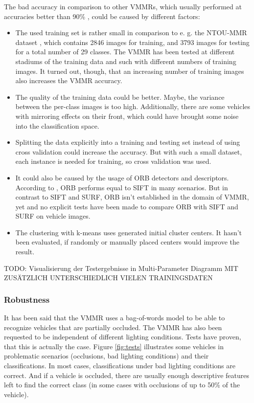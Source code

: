 The bad accuracy in comparison to other VMMRs, which usually performed at accuracies better than 90\% \citep{petrovic2004analysis} \citep{siddiqui2015robust}, could be caused by different factors:
\begin{itemize}
  \item The used training set is rather small in comparison to e. g. the NTOU-MMR dataset \citep{ntoummrDataset}, which contains 2846 images for training, and 3793 images for testing for a total number of 29 classes. The VMMR has been tested at different stadiums of the training data and such with different numbers of training images. It turned out, though, that an increasing number of training images also increases the VMMR accuracy.
  \item The quality of the training data could be better. Maybe, the variance between the per-class images is too high. Additionally, there are some vehicles with mirroring effects on their front, which could have brought some noise into the classification space.
  \item Splitting the data explicitly into a training and testing set instead of using cross validation could increase the accuracy. But with such a small dataset, each instance is needed for training, so cross validation was used.
  \item It could also be caused by the usage of ORB detectors and descriptors. According to \citep{rublee2011orb}, ORB performs equal to SIFT in many scenarios. But in contrast to SIFT and SURF, ORB isn't established in the domain of VMMR, yet and no explicit tests have been made to compare ORB with SIFT and SURF on vehicle images.
  \item The clustering with k-means uses generated initial cluster centers. It hasn't been evaluated, if randomly or manually placed centers would improve the result.
\end{itemize}

TODO: Visualisierung der Testergebnisse in Multi-Parameter Diagramm MIT ZUSÄTZLICH UNTERSCHIEDLICH VIELEN TRAININGSDATEN

\subsubsection{Robustness}
It has been said that the VMMR uses a bag-of-words model to be able to recognize vehicles that are partially occluded. The VMMR has also been requested to be independent of different lighting conditions. Tests have proven, that this is actually the case. Figure \ref{fig:tests} illustrates some vehicles in problematic scenarios (occlusions, bad lighting conditions) and their classifications. In most cases, classifications under bad lighting conditions are correct. And if a vehicle is occluded, there are usually enough descriptive features left to find the correct class (in some cases with occlusions of up to 50\% of the vehicle).


